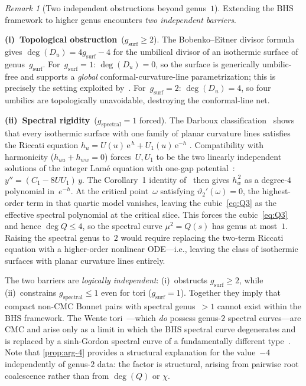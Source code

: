 \documentclass[11pt,a4paper]{article}
\theoremstyle{plain}
\theoremstyle{definition}
\theoremstyle{remark}
\newtheorem{remark}[theorem]{Remark}
\newcommand{\ee}{\mathrm{e}}
\begin{document}
\begin{remark}[Two independent obstructions beyond genus~$1$]
\label{rem:umbilical-obstruction}
Extending the BHS framework to higher genus encounters
\emph{two independent barriers}.

\noindent\textbf{(i)~Topological obstruction}~($g_{\mathrm{surf}} \geq 2$).
The Bobenko--Eitner divisor formula~\cite{BE00} gives
$\deg(D_u) = 4g_{\mathrm{surf}} - 4$ for the umbilical divisor
of an isothermic surface of genus~$g_{\mathrm{surf}}$.
For~$g_{\mathrm{surf}} = 1$: $\deg(D_u) = 0$, so the surface is
generically umbilic-free and supports a \emph{global}
conformal-curvature-line parametrization; this is precisely the
setting exploited by~\cite{BHS25,BHS-comp}.
For~$g_{\mathrm{surf}} = 2$: $\deg(D_u) = 4$, so four umbilics are
topologically unavoidable, destroying the conformal-line net.

\noindent\textbf{(ii)~Spectral rigidity}~($g_{\mathrm{spectral}} = 1$ forced).
The Darboux classification~\cite{Dar83} shows that every
isothermic surface with one family of planar curvature lines
satisfies the Riccati equation
$h_u = U(u)\,\ee^{\,h} + U_1(u)\,\ee^{-h}$
\cite[Theorem~1]{BHS-comp}.  Compatibility with harmonicity
($h_{uu} + h_{ww} = 0$) forces~$U,U_1$ to be
the two linearly independent solutions of the integer Lam\'{e}
equation with one-gap potential~\cite[Lemma~1]{BHS-comp}:
$y'' = (C_1 - 8 U U_1)\,y.$
The Corollary~1 identity of~\cite{BHS-comp} then gives
$h_w^{\,2}$ as a degree-$4$ polynomial in~$e^{-h}$.  At the critical
point~$\omega$ satisfying $\vartheta_2'(\omega) = 0$, the highest-order
term in that quartic model vanishes, leaving the cubic~\eqref{eq:Q3} as
the effective spectral polynomial at the critical slice.
This forces the cubic~\eqref{eq:Q3}
and hence $\deg Q \leq 4$, so the spectral curve
$\mu^2 = Q(s)$ has genus at most~$1$.
Raising the spectral genus to~$2$ would require replacing the
two-term Riccati equation with a higher-order nonlinear ODE---i.e.,
leaving the class of isothermic surfaces with planar curvature
lines entirely.

\medskip
The two barriers are \emph{logically independent}: (i)~obstructs
$g_{\mathrm{surf}} \geq 2$, while (ii)~constrains
$g_{\mathrm{spectral}} \leq 1$ even for tori
($g_{\mathrm{surf}} = 1$).  Together they imply that compact
non-CMC Bonnet pairs with spectral genus~$>1$ cannot exist
within the BHS framework.  The Wente tori~\cite{Wen86}---which \emph{do}
possess genus-$2$ spectral curves---are CMC and arise only as a
limit in which the BHS spectral curve degenerates and is replaced
by a sinh-Gordon spectral curve of a fundamentally different
type~\cite{CKKS21}.
%
Note that \cref{prop:arg-4} provides a structural explanation
for the value~$-4$
independently of genus-$2$ data: the factor is structural,
arising from pairwise root coalescence rather than from
$\deg(Q)$ or $\chi$.
\end{remark}
\end{document}
